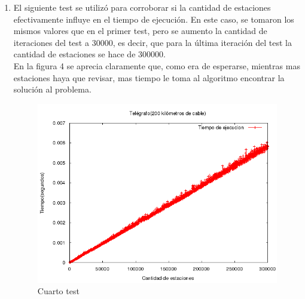 \documentclass[10pt, a4paper]{article}
\begin{document}
\begin{enumerate}
	\item El siguiente test se utiliz\'o para corroborar si la cantidad de estaciones efectivamente influye en el tiempo de ejecuci\'on. En este caso, se tomaron los mismos valores que en el primer test, pero se aumento la cantidad de iteraciones del test a 30000, es decir, que para la \'ultima iteraci\'on del test la cantidad de estaciones se hace de 300000.\\ 
	En la figura 4 se aprecia claramente que, como era de esperarse, mientras mas estaciones haya que revisar, mas tiempo le toma al algoritmo encontrar la soluci\'on al problema.\\
	\begin{figure}[H]
  		\centering
   	 	\includegraphics[width=1\textwidth]
   	 	{Imagenes/telegrafoTiempos3.png}
		\caption{Cuarto test}
	\end{figure}
	

\end{enumerate}
\end{document}
